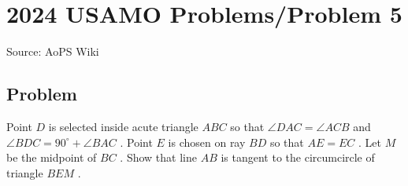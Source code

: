 \documentclass[12pt]{article}
\begin{document}
\section*{{2024 USAMO Problems/Problem 5}}
Source: AoPS Wiki

\subsection*{Problem}
Point $D$ is selected inside acute triangle $ABC$ so that $\angle DAC=\angle ACB$ and $\angle BDC=90^\circ+\angle BAC$ . Point $E$ is chosen on ray $BD$ so that $AE=EC$ . Let $M$ be the midpoint of $BC$ . Show that line $AB$ is tangent to the circumcircle of triangle $BEM$ .
\end{document}
